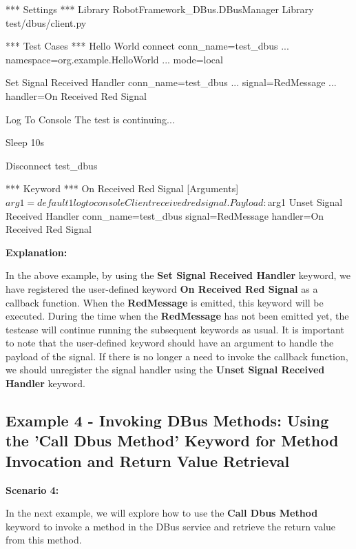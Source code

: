 \begin{robotcode}
*** Settings ***
Library    RobotFramework_DBus.DBusManager
Library    test/dbus/client.py
 
*** Test Cases ***
Hello World
   connect    conn_name=test_dbus    
   ...        namespace=org.example.HelloWorld
   ...        mode=local

   Set Signal Received Handler    conn_name=test_dbus    
   ...                            signal=RedMessage    
   ...                            handler=On Received Red Signal
   
   Log To Console    The test is continuing...

   Sleep    10s
   
   Disconnect    test_dbus

*** Keyword ***
On Received Red Signal
   [Arguments]    ${arg1}=default 1
   log to console      Client received red signal. Payload: ${arg1}
   Unset Signal Received Handler    conn_name=test_dbus    signal=RedMessage    handler=On Received Red Signal
\end{robotcode}

\textbf{Explanation:}

In the above example, by using the \textbf{Set Signal Received Handler} keyword, we have registered the user-defined keyword \textbf{On Received Red Signal} as a callback function. 
When the \textbf{RedMessage} is emitted, this keyword will be executed. During the time when the \textbf{RedMessage} has not been emitted yet, the testcase will continue running the 
subsequent keywords as usual. It is important to note that the user-defined keyword should have an argument to handle the payload of the signal. If there is no longer a need to invoke 
the callback function, we should unregister the signal handler using the \textbf{Unset Signal Received Handler} keyword.



\hypertarget{description-example4}{%
\subsection{\texorpdfstring{\textbf{Example 4 - Invoking DBus Methods: Using the 'Call Dbus Method' Keyword for Method Invocation and Return Value Retrieval}}{Example 4 - Invoking DBus Methods: Using the 'Call Dbus Method' Keyword for Method Invocation and Return Value Retrieval}}\label{description-example4}}

\textbf{Scenario 4:}

In the next example, we will explore how to use the \textbf{Call Dbus Method} keyword to invoke a method in the DBus service and retrieve the return value from this method.



